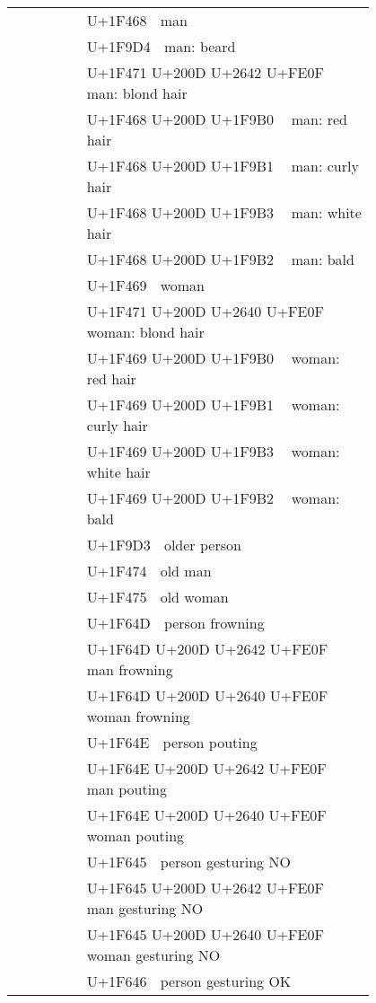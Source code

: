 \documentclass[a4paper,12pt]{article}
\newcommand{\fontA}[1]{{\fontspec[RawFeature={mode=harf,+dist,+ccmp}]{Segoe UI Emoji} #1}}
\newcommand{\fontB}[1]{{\fontspec[RawFeature={mode=harf,+dist,+ccmp}]{Noto Color Emoji} #1}}
\begin{document}
\begin{longtable}[c]{ccp{0.8\linewidth}}
\fontA{👨}&\fontB{👨}&U+1F468 👨 man\\
\fontA{🧔}&\fontB{🧔}&U+1F9D4 🧔 man: beard\\
\fontA{👱‍♂️}&\fontB{👱‍♂️}&U+1F471 U+200D U+2642 U+FE0F 👱‍♂️ man: blond hair\\
\fontA{👨‍🦰}&\fontB{👨‍🦰}&U+1F468 U+200D U+1F9B0 👨‍🦰 man: red hair\\
\fontA{👨‍🦱}&\fontB{👨‍🦱}&U+1F468 U+200D U+1F9B1 👨‍🦱 man: curly hair\\
\fontA{👨‍🦳}&\fontB{👨‍🦳}&U+1F468 U+200D U+1F9B3 👨‍🦳 man: white hair\\
\fontA{👨‍🦲}&\fontB{👨‍🦲}&U+1F468 U+200D U+1F9B2 👨‍🦲 man: bald\\
\fontA{👩}&\fontB{👩}&U+1F469 👩 woman\\
\fontA{👱‍♀️}&\fontB{👱‍♀️}&U+1F471 U+200D U+2640 U+FE0F 👱‍♀️ woman: blond hair\\
\fontA{👩‍🦰}&\fontB{👩‍🦰}&U+1F469 U+200D U+1F9B0 👩‍🦰 woman: red hair\\
\fontA{👩‍🦱}&\fontB{👩‍🦱}&U+1F469 U+200D U+1F9B1 👩‍🦱 woman: curly hair\\
\fontA{👩‍🦳}&\fontB{👩‍🦳}&U+1F469 U+200D U+1F9B3 👩‍🦳 woman: white hair\\
\fontA{👩‍🦲}&\fontB{👩‍🦲}&U+1F469 U+200D U+1F9B2 👩‍🦲 woman: bald\\
\fontA{🧓}&\fontB{🧓}&U+1F9D3 🧓 older person\\
\fontA{👴}&\fontB{👴}&U+1F474 👴 old man\\
\fontA{👵}&\fontB{👵}&U+1F475 👵 old woman\\
\fontA{🙍}&\fontB{🙍}&U+1F64D 🙍 person frowning\\
\fontA{🙍‍♂️}&\fontB{🙍‍♂️}&U+1F64D U+200D U+2642 U+FE0F 🙍‍♂️ man frowning\\
\fontA{🙍‍♀️}&\fontB{🙍‍♀️}&U+1F64D U+200D U+2640 U+FE0F 🙍‍♀️ woman frowning\\
\fontA{🙎}&\fontB{🙎}&U+1F64E 🙎 person pouting\\
\fontA{🙎‍♂️}&\fontB{🙎‍♂️}&U+1F64E U+200D U+2642 U+FE0F 🙎‍♂️ man pouting\\
\fontA{🙎‍♀️}&\fontB{🙎‍♀️}&U+1F64E U+200D U+2640 U+FE0F 🙎‍♀️ woman pouting\\
\fontA{🙅}&\fontB{🙅}&U+1F645 🙅 person gesturing NO\\
\fontA{🙅‍♂️}&\fontB{🙅‍♂️}&U+1F645 U+200D U+2642 U+FE0F 🙅‍♂️ man gesturing NO\\
\fontA{🙅‍♀️}&\fontB{🙅‍♀️}&U+1F645 U+200D U+2640 U+FE0F 🙅‍♀️ woman gesturing NO\\
\fontA{🙆}&\fontB{🙆}&U+1F646 🙆 person gesturing OK\\

\end{longtable}
\end{document}
